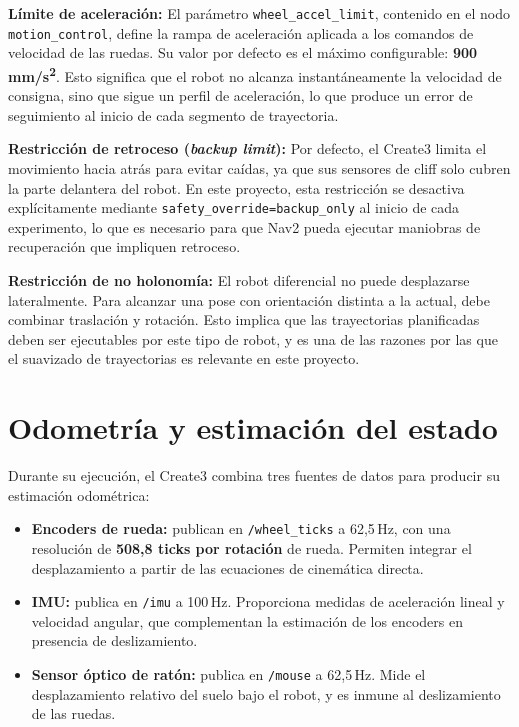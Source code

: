 \textbf{Límite de aceleración:} El parámetro \texttt{wheel\_accel\_limit}, contenido en el nodo \texttt{motion\_control}, define la rampa de aceleración aplicada a los comandos de velocidad de las ruedas. Su valor por defecto es el máximo configurable: \textbf{900\,mm/s\textsuperscript{2}}. Esto significa que el robot no alcanza instantáneamente la velocidad de consigna, sino que sigue un perfil de aceleración, lo que produce un error de seguimiento al inicio de cada segmento de trayectoria.

\textbf{Restricción de retroceso (\textit{backup limit}):} Por defecto, el Create3 limita el movimiento hacia atrás para evitar caídas, ya que sus sensores de cliff solo cubren la parte delantera del robot. En este proyecto, esta restricción se desactiva explícitamente mediante \texttt{safety\_override=backup\_only} al inicio de cada experimento, lo que es necesario para que Nav2 pueda ejecutar maniobras de recuperación que impliquen retroceso.

\textbf{Restricción de no holonomía:} El robot diferencial no puede desplazarse lateralmente. Para alcanzar una pose con orientación distinta a la actual, debe combinar traslación y rotación. Esto implica que las trayectorias planificadas deben ser ejecutables por este tipo de robot, y es una de las razones por las que el suavizado de trayectorias es relevante en este proyecto.

\section{Odometría y estimación del estado}

Durante su ejecución, el Create3 combina tres fuentes de datos para producir su estimación odométrica\cite{create3_docs}:

\begin{itemize}
    \item \textbf{Encoders de rueda:} publican en \texttt{/wheel\_ticks} a 62,5\,Hz, con una resolución de \textbf{508,8 ticks por rotación} de rueda. Permiten integrar el desplazamiento a partir de las ecuaciones de cinemática directa.
    \item \textbf{IMU:} publica en \texttt{/imu} a 100\,Hz. Proporciona medidas de aceleración lineal y velocidad angular, que complementan la estimación de los encoders en presencia de deslizamiento.
    \item \textbf{Sensor óptico de ratón:} publica en \texttt{/mouse} a 62,5\,Hz. Mide el desplazamiento relativo del suelo bajo el robot, y es inmune al deslizamiento de las ruedas.
\end{itemize}


